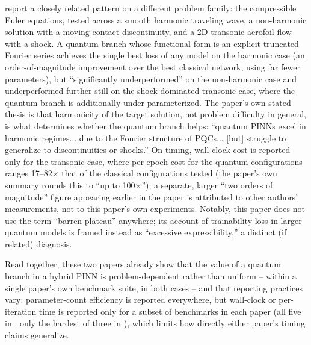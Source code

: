 \citet{hqpinn2025flow} report a closely related pattern on a different
problem family: the compressible Euler equations, tested across a smooth
harmonic traveling wave, a non-harmonic solution with a moving contact
discontinuity, and a 2D transonic aerofoil flow with a shock. A quantum
branch whose functional form is an explicit truncated Fourier series
achieves the single best loss of any model on the harmonic case (an
order-of-magnitude improvement over the best classical network, using far
fewer parameters), but ``significantly underperformed'' on the non-harmonic
case and underperformed further still on the shock-dominated transonic
case, where the quantum branch is additionally under-parameterized. The
paper's own stated thesis is that harmonicity of the target solution, not
problem difficulty in general, is what determines whether the quantum
branch helps: ``quantum PINNs excel in harmonic regimes... due to the
Fourier structure of PQCs... [but] struggle to generalize to
discontinuities or shocks.'' On timing, wall-clock cost is reported only
for the transonic case, where per-epoch cost for the quantum configurations
ranges 17--82$\times$ that of the classical configurations tested (the
paper's own summary rounds this to ``up to 100$\times$''); a separate,
larger ``two orders of magnitude'' figure appearing earlier in the paper is
attributed to other authors' measurements, not to this paper's own
experiments. Notably, this paper does not use the term ``barren plateau''
anywhere; its account of trainability loss in larger quantum models is
framed instead as ``excessive expressibility,'' a distinct (if related)
diagnosis.

Read together, these two papers already show that the value of a quantum
branch in a hybrid PINN is problem-dependent rather than uniform -- within
a single paper's own benchmark suite, in both cases -- and that reporting
practices vary: parameter-count efficiency is reported everywhere, but
wall-clock or per-iteration time is reported only for a subset of
benchmarks in each paper (all five in \citealp{farea2025qcpinn}, only the
hardest of three in \citealp{hqpinn2025flow}), which limits how directly
either paper's timing claims generalize.

